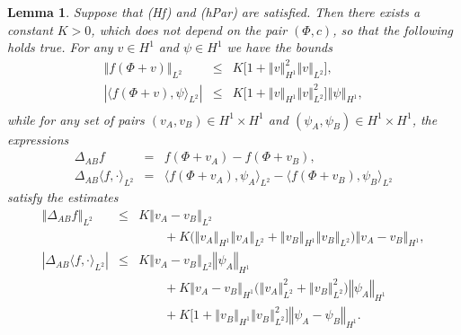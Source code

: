 \documentclass[10pt]{articleHJ}
\newcommand{\abs}[1]{\left\vert#1\right\vert}			%
\newcommand{\norm}[1]{\left\Vert#1\right\Vert}		%
\newtheorem{lem}[thm]{Lemma}
\numberwithin{equation}{section}
\begin{document}
\begin{lem}
\label{lem:prlm:f:bnds}
Suppose that (Hf) and (hPar) are satisfied.
Then there exists a constant $K > 0$, which does not
depend on the pair $(\Phi, c)$, so that the following holds true.
For any $v \in H^1$ and $\psi \in H^1$
we have the bounds
\begin{equation}
\label{eq:prlm:f:glb:bnds}
\begin{array}{lcl}
 \norm{f(\Phi + v)}_{L^2} & \le &
   K \big[1 + \norm{v}_{H^1}^2 \norm{v}_{L^2} \big] ,
\\[0.2cm]
 \abs{\langle f(\Phi + v), \psi \rangle_{L^2} }
   & \le &
     K \big[1  + \norm{v}_{H^1} \norm{v}_{L^2}^2 \big]
       \norm{\psi}_{H^1} ,
\\[0.2cm]
\end{array}
\end{equation}
while for any set of pairs $(v_A, v_B) \in H^1 \times H^1$
and $(\psi_A, \psi_B) \in H^1 \times H^1$,
the expressions
\begin{equation}
\begin{array}{lcl}
\Delta_{AB} f & = & f(\Phi + v_A) - f(\Phi + v_B) ,
\\[0.2cm]
\Delta_{AB}\langle f, \cdot \rangle_{L^2}
  & = & \langle f(\Phi + v_A ) , \psi_A \rangle_{L^2}
  - \langle f(\Phi + v_B) , \psi_B \rangle_{L^2}
\end{array}
\end{equation}
satisfy the estimates
\begin{equation}
\label{eq:prlm:f:lip:bnds}
\begin{array}{lcl}
\norm{ \Delta_{AB} f }_{L^2}
  & \le &
  K \norm{v_A-v_B}_{L^2}
\\[0.2cm]
& & \qquad
  + K
  \Big( \norm{v_A}_{H^1} \norm{v_A}_{L^2}
    + \norm{v_B}_{H^1} \norm{v_B}_{L^2} \Big)
   \norm{v_A-v_B}_{H^1} ,
\\[0.2cm]
%
\abs{\Delta_{AB}\langle f, \cdot \rangle_{L^2} }
 & \le &
 K \norm{v_A-v_B}_{L^2} \norm{\psi_A}_{H^1}
\\[0.2cm]
& & \qquad
  + K \norm{v_A-v_B}_{H^1} \big( \norm{v_A}_{L^2}^2 + \norm{v_B}_{L^2}^2 \big)
    \norm{\psi_A}_{H^1}
\\[0.2cm]
& & \qquad
  + K \Big[ 1
    + \norm{v_B}_{H^1} \norm{v_B}_{L^2}^2 \Big]
    \norm{\psi_A - \psi_B}_{H^1} .
\end{array}
\end{equation}
\end{lem}
\end{document}
